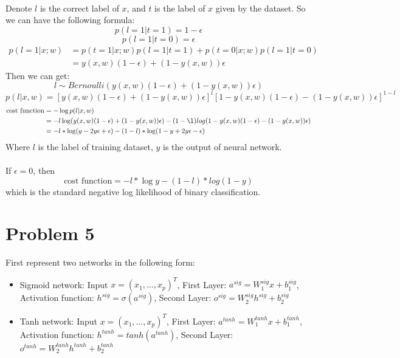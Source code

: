 \documentclass[twoside]{article}
\begin{document}
\paragraph{}Denote $l$ is the correct label of $x$, and $t$ is the label of $x$ given by the dataset.
So we can have the following formula:
$$p(l = 1 | t=1) = 1-\epsilon$$
$$p(l = 1 | t=0) = \epsilon$$
\begin{align*}
p(l=1 | x; w) &= p(t=1| x; w)p(l=1|t=1)+p(t=0| x; w)p(l=1|t=0)\\
&=y(x, w)(1-\epsilon) + (1-y(x, w))\epsilon 
\end{align*}
Then we can get:
$$l \sim Bernoulli\left(y(x, w)(1-\epsilon) + (1-y(x, w))\epsilon\right)$$
$$p(l |x, w) =\left[y(x, w)(1-\epsilon) + (1-y(x, w))\epsilon\right]^{l}[1-y(x, w)(1-\epsilon) - (1-y(x, w))\epsilon]^{1-l}$$
\begin{align*}
\text{cost function} &= - \log p(l |x, w)\\
&= - l \log(y(x, w)(1-\epsilon) + (1-y(x, w))\epsilon ) - (1-\l) log(1-y(x, w)(1-\epsilon) - (1-y(x, w))\epsilon )\\
&= -l * \log(y-2y\epsilon+\epsilon) - (1-l) * \log(1-y+2y\epsilon-\epsilon)
\end{align*}
Where $l$ is the label of training dataset, $y$ is the output of neural network.

\paragraph{} If $\epsilon=0$, then $$\text{cost function} = -l * \log y - (1-l) *log(1-y)$$ which is the standard negative log likelihood of binary classification.

\section{Problem 5}
First represent two networks in the following form:
\begin{itemize}
\item Sigmoid network: Input $x=(x_1, \dots, x_p)^T$, First Layer: $a^{sig} = W^{sig}_{1}x + b^{sig}_1$, Activation function: $h^{sig} = \sigma (a^{sig})$, Second Layer: $o^{sig} = W^{sig}_2 h^{sig} + b^{sig}_2$

\item Tanh network: Input $x=(x_1, \dots, x_p)^T$, First Layer: $a^{tanh} = W^{tanh}_{1}x + b^{tanh}_1$, Activation function: $h^{tanh} = tanh (a^{tanh})$, Second Layer: $o^{tanh} = W^{tanh}_2 h^{tanh} + b^{tanh}_2$
\end{itemize}
\end{document}
